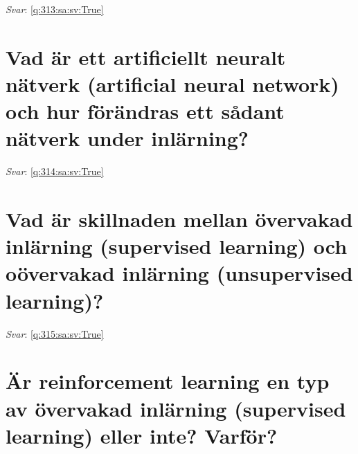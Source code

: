 \documentclass[a4paper,11pt,oneside]{book}
\begin{document}
\begin{sloppypar}
\label{q:313:sa:sv:False}

\vspace{2cm}

\noindent\makebox[\textwidth]{\hrulefill}

\vspace{1cm}

\textit{Svar}: \autoref{q:313:sa:sv:True}



\section{Vad \"ar ett artificiellt neuralt n\"atverk (artificial neural network) och hur f\"or\"andras ett s\r{a}dant n\"atverk under inl\"arning?}

\label{q:314:sa:sv:False}

\vspace{2cm}

\noindent\makebox[\textwidth]{\hrulefill}

\vspace{1cm}

\textit{Svar}: \autoref{q:314:sa:sv:True}



\section{Vad \"ar skillnaden mellan \"overvakad inl\"arning (supervised learning) och o\"overvakad inl\"arning (unsupervised learning)?}

\label{q:315:sa:sv:False}

\vspace{2cm}

\noindent\makebox[\textwidth]{\hrulefill}

\vspace{1cm}

\textit{Svar}: \autoref{q:315:sa:sv:True}



\section{\"Ar reinforcement learning en typ av \"overvakad inl\"arning (supervised learning) eller inte? Varf\"or?}

\label{q:316:sa:sv:False}

\vspace{2cm}

\noindent\makebox[\textwidth]{\hrulefill}


\end{sloppypar}
\end{document}
